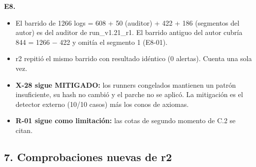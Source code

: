 \documentclass[
]{article}
\providecommand{\tightlist}{%
  \setlength{\itemsep}{0pt}\setlength{\parskip}{0pt}}
\begin{document}
\textbf{E8.}

\begin{itemize}
\tightlist
\item
  El barrido de 1266 logs = 608 + 50 (auditor) + 422 + 186 (segmentos
  del autor) es del auditor de run\_v1.21\_r1. El barrido antiguo del
  autor cubría 844 = 1266 − 422 y omitía el segmento 1 (E8-01).
\item
  r2 repitió el mismo barrido con resultado idéntico (0 alertas). Cuenta
  una sola vez.
\item
  \textbf{X-28 sigue MITIGADO:} los runners congelados mantienen un
  patrón insuficiente, su hash no cambió y el parche no se aplicó. La
  mitigación es el detector externo (10/10 casos) más los conos de
  axiomas.
\item
  \textbf{R-01 sigue como limitación:} las cotas de segundo momento de
  C.2 se citan.
\end{itemize}

\subsection{7. Comprobaciones nuevas de
r2}\label{7-comprobaciones-nuevas-de-r2}
\end{document}
